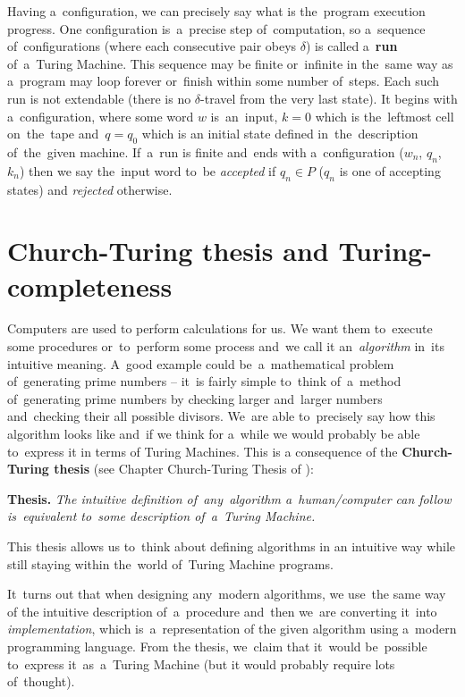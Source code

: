 \documentclass[english,shortabstract,mgr]{iithesis}
\begin{document}
Having a~configuration, we can precisely say what is the~program execution progress.
One configuration is~a~precise step of~computation, so a~sequence of~configurations (where
each consecutive pair obeys $\delta$) is called
a~\textbf{run} of~a~Turing Machine. This sequence may be finite or~infinite in the~same way as
a~program may loop forever or~finish within some number of~steps. Each such run is not extendable
(there is no $\delta$-travel from the very last state). It begins with
a~configuration, where some word $w$ is~an~input, $k = 0$ which is the~leftmost cell on~the~tape
and~$q = q_0$ which is an initial state defined in~the~description of~the~given machine. If~a~run is
finite and~ends with a~configuration ($w_n$, $q_n$, $k_n$) then we say the~input word to~be
\textit{accepted} if $q_n \in P$ ($q_n$ is one of accepting states) and \textit{rejected} otherwise.

\section{Church-Turing thesis and Turing-completeness}

Computers are used to perform calculations for us. We want them to~execute some
procedures or~to~perform some process and~we call it an~\textit{algorithm} in~its intuitive meaning.
A~good example could be~a~mathematical problem of~generating prime numbers -- it~is fairly simple
to~think of~a~method of~generating prime numbers by checking larger and~larger numbers and~checking
their all possible divisors. We~are able to~precisely say how this algorithm looks like and~if
we think for a~while we would probably be able to~express it in terms of Turing Machines. This
is a consequence of the \textbf{Church-Turing thesis} (see Chapter Church-Turing Thesis of \cite{sipser2012ChurchTuring}):

\textbf{Thesis.} \textit{The intuitive definition of~any~algorithm a~human/computer can follow is~equivalent
to~some description of~a~Turing Machine.}

This thesis allows us to~think about defining algorithms in an intuitive way while still staying
within the~world of~Turing Machine programs.

It~turns out that when designing any~modern algorithms, we use~the same way of the intuitive description
of~a~procedure and~then we~are converting it~into \textit{implementation}, which is~a~representation
of the given algorithm using a~modern programming language. From the thesis, we~claim that
it~would be~possible to~express it~as~a~Turing Machine (but it would probably require lots of~thought).
\end{document}
